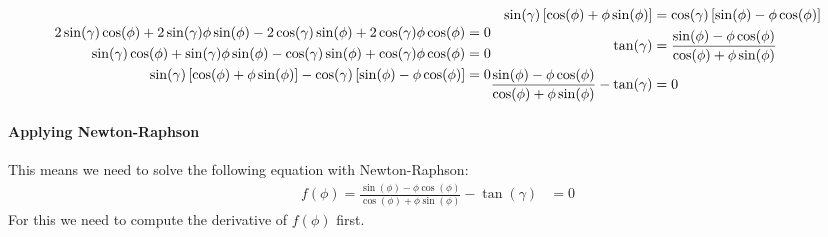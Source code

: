 \begin{subequations}
\begin{align}
    2\sin(\gamma)\cos(\phi) + 2\sin(\gamma)\phi\sin(\phi) - 2\cos(\gamma)\sin(\phi) + 2\cos(\gamma)\phi\cos(\phi) &= 0\\
    \sin(\gamma)\cos(\phi) + \sin(\gamma)\phi\sin(\phi) - \cos(\gamma)\sin(\phi) + \cos(\gamma)\phi\cos(\phi) &= 0\\
    \sin(\gamma)\left[\cos(\phi) + \phi\sin(\phi)\right] - \cos(\gamma)\left[\sin(\phi) - \phi\cos(\phi)\right]&= 0
\end{align}
\vspace*{-2.5em}
\begin{align}
    \sin(\gamma)\left[\cos(\phi) + \phi\sin(\phi)\right] &= \cos(\gamma)\left[\sin(\phi) - \phi\cos(\phi)\right]\\
    \tan(\gamma) &= \frac{\sin(\phi) - \phi\cos(\phi)}{\cos(\phi) + \phi\sin(\phi)}\\
    \frac{\sin(\phi) - \phi\cos(\phi)}{\cos(\phi) + \phi\sin(\phi)} - \tan(\gamma) &=0
\end{align}
\end{subequations}

\paragraph{Applying Newton-Raphson}
This means we need to solve the following equation with Newton-Raphson:
\begin{align}
    f(\phi) = \frac{\sin(\phi) - \phi\cos(\phi)}{\cos(\phi) + \phi\sin(\phi)} - \tan(\gamma) &=0
\end{align}
For this we need to compute the derivative of $f(\phi)$ first.

